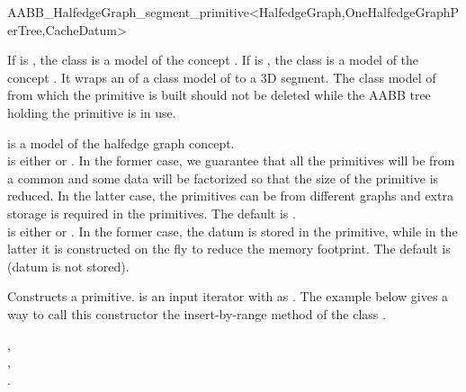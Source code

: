 \ccRefPageBegin

\begin{ccRefClass}{AABB_HalfedgeGraph_segment_primitive<HalfedgeGraph,OneHalfedgeGraphPerTree,CacheDatum>}

\ccDefinition
  
If  is , the class is a model of the concept .
If  is , the class is a model of the concept .
It wraps an  of a class model of  to a 3D segment.
The class model of  from which the primitive is built should not be deleted
while the AABB tree holding the primitive is in use.



\ccParameters
{} is a model of the halfedge graph concept.\\
 is either  or . In the former case, we guarantee that all the primitives will be from a common  and some data 
will be factorized so that the size of the primitive is reduced. In the latter case, the primitives can be from different graphs and extra storage is required in the primitives. The default is .\\
 is either  or . In the former case, the datum is stored in the primitive, while in the latter it is constructed on the fly to reduce
the memory footprint. The default is  (datum is not stored).


\ccTypes
{}
\ccGlue
{}
\ccGlue
{}

\ccCreation
{}

{Constructs a primitive.  is an input iterator with  as .
The example below gives a way to call this constructor the insert-by-range method of the class .}


\ccSeeAlso

,\\
,\\
.\\


\end{ccRefClass}

\ccRefPageEnd
